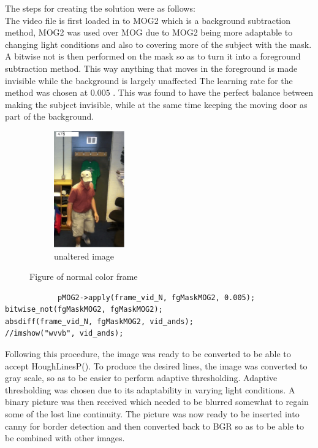 \documentclass{article}
\begin{document}
The steps for  creating the solution were as follows:\\

The video file is first loaded in to MOG2 which is a background subtraction method, MOG2 was used over MOG due to MOG2 being more adaptable to changing light conditions and also to covering more of the subject with the mask.\\

A bitwise not is then performed on the mask so as to turn it into a foreground subtraction method. This way anything that moves in the foreground is made invisible while the background is largely unaffected The learning rate for the method was chosen at $0.005$ . This was found to have the perfect balance between making the subject invisible, while at the same time keeping the moving door as part of the background.\\




\begin{figure}[H]
\begin{subfigure}{0.5\textwidth}
\includegraphics[width=0.5\linewidth, height=5cm]{prof_color.png} 
\caption{unaltered image}
\label{fig:subim1}
\end{subfigure}

\caption{Figure of normal color frame}
\label{fig:image2}
\end{figure}

\begin{lstlisting}
			pMOG2->apply(frame_vid_N, fgMaskMOG2, 0.005);
bitwise_not(fgMaskMOG2, fgMaskMOG2);
absdiff(frame_vid_N, fgMaskMOG2, vid_ands);
//imshow("wvvb", vid_ands);
\end{lstlisting}

Following this procedure, the image was ready to be converted to be able to accept HoughLinesP(). To produce the desired lines, the image was converted to gray scale, so as to be easier to perform adaptive thresholding. Adaptive thresholding was chosen due to its adaptability in varying light conditions. A binary picture was then received which needed to be blurred somewhat to regain some of the lost line continuity. The picture was now ready to be inserted into canny for border detection and then converted back to BGR so as to be able to be combined with other images.
\end{document}
